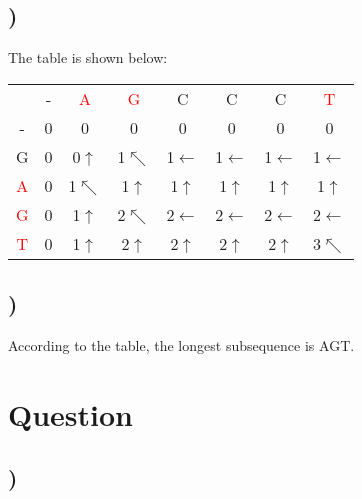 \documentclass{article}
\begin{document}
\subsection{)}
The table is shown below:
\begin{center}
\begin{tabular}{c|c|c|c|c|c|c|c|}
\multicolumn{1}{c}{ } & \multicolumn{1}{c}{-} & \multicolumn{1}{c}{\textcolor{red}{A}} & \multicolumn{1}{c}{\textcolor{red}{G}} & \multicolumn{1}{c}{C} & \multicolumn{1}{c}{C} & \multicolumn{1}{c}{C} & \multicolumn{1}{c}{\textcolor{red}{T}} \\
\cline{2-8}
- & 0 & 0 & 0 & 0 & 0 & 0 & 0 \\
\cline{2-8}
G & 0 & 0$\uparrow$ & 1$\nwarrow$ & 1$\leftarrow$ & 1$\leftarrow$ & 1$\leftarrow$ & 1$\leftarrow$ \\
\cline{2-2}
\textcolor{red}{A} & 0 & \cellcolor{red!50}1$\nwarrow$ & 1$\uparrow$ & 1$\uparrow$ & 1$\uparrow$ & 1$\uparrow$ & 1$\uparrow$ \\
\cline{2-2}
\textcolor{red}{G} & 0 & 1$\uparrow$ & \cellcolor{red!50}2$\nwarrow$ & \cellcolor{red!50}2$\leftarrow$ & \cellcolor{red!50}2$\leftarrow$ & \cellcolor{red!50}2$\leftarrow$ & \cellcolor{white}2$\leftarrow$ \\
\cline{2-2}
\textcolor{red}{T} & 0 & 1$\uparrow$ & 2$\uparrow$ & 2$\uparrow$ & 2$\uparrow$ & 2$\uparrow$ & \cellcolor{red!50}3$\nwarrow$ \\
\cline{2-8}
\end{tabular}
\end{center}

\subsection{)}
According to the table, the longest subsequence is AGT.

\section{Question }
\subsection{)}
\end{document}
